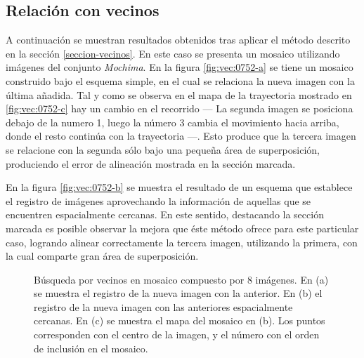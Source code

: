 \subsection*{Relación con vecinos}

A continuación se muestran resultados obtenidos tras aplicar el método descrito en la sección \ref{seccion-vecinos}. En este caso se presenta un mosaico utilizando imágenes del conjunto \textit{Mochima}. En la figura \ref{fig:vec:0752-a} se tiene un mosaico construido bajo el esquema simple, en el cual se relaciona la nueva imagen con la última añadida. Tal y como se observa en el mapa de la trayectoria mostrado en \ref{fig:vec:0752-c} hay un cambio en el recorrido --- La segunda imagen se posiciona debajo de la numero 1, luego la número 3 cambia el movimiento hacia arriba, donde el resto continúa con la trayectoria ---. Esto produce que la tercera imagen se relacione con la segunda sólo bajo una pequeña área de superposición, produciendo el error de alineación mostrada en la sección marcada.

En la figura \ref{fig:vec:0752-b} se muestra el resultado de un esquema que establece el registro de imágenes aprovechando la información de aquellas que se encuentren espacialmente cercanas. En este sentido, destacando la sección marcada es posible observar la mejora que éste método ofrece para este particular caso, logrando alinear correctamente la tercera imagen, utilizando la primera, con la cual comparte gran área de superposición.  



\begin{figure}[h]
	\centering     %
	\hspace{1mm}%
	\hspace{1mm}%
	
	\caption[Busqueda de vecinos: \textit{Búsqueda por vecinos: \textit{Mochima}}]{Búsqueda por vecinos en mosaico compuesto por 8 imágenes. En (a) se muestra el registro de la nueva imagen con la anterior. En (b) el registro de la nueva imagen con las anteriores espacialmente cercanas. En (c) se muestra el mapa del mosaico en (b). Los puntos corresponden con el centro de la imagen, y el número con el orden de inclusión en el mosaico.}
	\label{imagen:vecinos:0752}
\end{figure}


